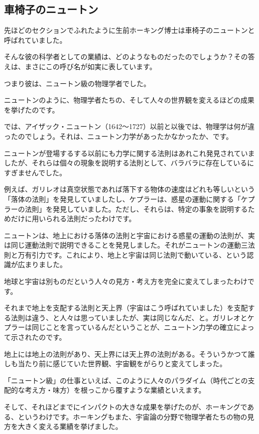 \documentclass[10pt,b5paper,papersize,dvipdfmx]{jsbook}
\begin{document}
\subsection{車椅子のニュートン}
先ほどのセクションでふれたように生前ホーキング博士は車椅子のニュートンと呼ばれていました。\par
そんな彼の科学者としての業績は、どのようなものだったのでしょうか？その答えは、まさにこの呼び名が如実に表しています。\par
つまり彼は、ニュートン級の物理学者でした。\par
ニュートンのように、物理学者たちの、そして人々の世界観を変えるほどの成果を挙げたのです。\par
では、アイザック・ニュートン（1642～1727）以前と以後では、物理学は何が違ったのでしょう。それは、ニュートン力学があったかなかったか、です。\par
ニュートンが登場するする以前にも力学に関する法則はあれこれ発見されていましたが、それらは個々の現象を説明する法則として、バラバラに存在しているにすぎませんでした。\par
例えば、ガリレオは真空状態であれば落下する物体の速度はどれも等しいという「落体の法則」を発見していましたし、ケプラーは、惑星の運動に関する「ケプラーの法則」を発見していました。ただし、それらは、特定の事象を説明するためだけに用いられる法則だったわけです。\par
ニュートンは、地上における落体の法則と宇宙における惑星の運動の法則が、実は同じ運動法則で説明できることを発見しました。それがニュートンの運動三法則と万有引力です。これにより、地上と宇宙は同じ法則で動いている、という認識が広まりました。\par
地球と宇宙は別ものだという人々の見方・考え方を完全に変えてしまったわけです。\par
それまで地上を支配する法則と天上界（宇宙はこう呼ばれていました）を支配する法則は違う、と人々は思っていましたが、実は同じなんだ、と。ガリレオとケプラーは同じことを言っているんだということが、ニュートン力学の確立によって示されたのです。\par
地上には地上の法則があり、天上界には天上界の法則がある。そういうかつて誰しも当たり前に感じていた世界観、宇宙観をがらりと変えてしまった。\par
「ニュートン級」の仕事といえば、このように人々のパラダイム（時代ごとの支配的な考え方・味方）を根っこから覆すような業績といえます。\par
そして、それほどまでにインパクトの大きな成果を挙げたのが、ホーキングである、というわけです。ホーキングもまた、宇宙論の分野で物理学者たちの物の見方を大きく変える業績を挙げました。\par
\end{document}
